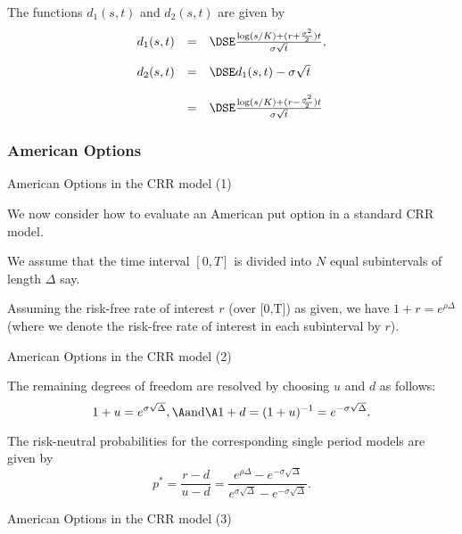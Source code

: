 	The functions $d_1(s,t)$ and $d_2(s,t)$ are given by
$$
\begin{array}{lll}
d_1(s,t) &=&\DSE \frac{\log(s/K) + (r +
\frac{\sigma^2}{2})t}{\sigma \sqrt{t}},\\*[12pt] d_2(s,t) &=&\DSE
d_1(s,t) -\sigma \sqrt{t}\\*[12pt]
&=&\DSE \frac{\log(s/K) + (r -
\frac{\sigma^2}{2})t}{\sigma \sqrt{t}}
\end{array}
$$





\subsubsection{American Options}

{ American Options in the CRR model (1)}






	We now consider how to evaluate an American put option in a
standard CRR model.


	We assume that the time interval $[0,T]$ is
divided into $N$ equal subintervals of length $\Delta $ say.


	Assuming the risk-free rate of interest $r$ (over [0,T]) as given,
we have $1+r = e^{\rho \Delta}$ (where we denote the risk-free
rate of interest in each subinterval by $r$).





{ American Options in the CRR model (2)}






	The remaining
degrees of freedom are resolved by choosing $u$ and $d$ as
follows:
$$
1+u= e^{\sigma \sqrt{\Delta}}, \A \mbox{and} \A 1+d = (1+u)^{-1} =
e^{-\sigma \sqrt{\Delta}}.
$$


	
The risk-neutral probabilities for
the corresponding single period models are given by
$$
p^*= \frac{r-d}{u-d} = \frac{e^{\rho \Delta}-e^{-\sigma
\sqrt{\Delta}}} {e^{\sigma \sqrt{\Delta}}-e^{-\sigma
\sqrt{\Delta}}}.
$$





{ American Options in the CRR model (3)}






